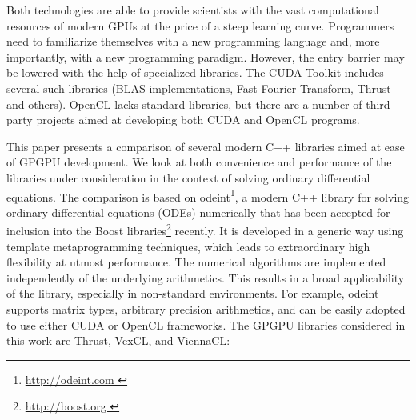 \documentclass[final]{siamltex}
\begin{document}
Both technologies are able to provide scientists with the vast computational
resources of modern GPUs at the price of a steep learning curve.  Programmers
need to familiarize themselves with a new programming language and, more
importantly, with a new programming paradigm. However, the entry barrier may be
lowered with the help of specialized libraries. The CUDA Toolkit includes
several such libraries (BLAS implementations, Fast Fourier Transform, Thrust
and others). OpenCL lacks standard libraries, but there are a number of
third-party projects aimed at developing both CUDA and OpenCL programs.

This paper presents a comparison of several modern C++ libraries aimed at ease
of GPGPU development. We look at both convenience and performance of the
libraries under consideration in the context of solving ordinary differential
equations.  The comparison is based on odeint\footnote{ \href{
http://odeint.com }{ http://odeint.com } }, a modern C++ library for solving
ordinary differential equations (ODEs) numerically  \cite{OdeintRef1,
OdeintRef2} that has been accepted for inclusion into the Boost
libraries\footnote{ \href{ http://boost.org } { http://boost.org } } recently.
It is developed in a generic way using template metaprogramming techniques,
which leads to extraordinary high flexibility at utmost performance. The
numerical algorithms are implemented independently of the underlying
arithmetics. This results in a broad applicability of the library, especially
in non-standard environments.  For example, odeint supports matrix types,
arbitrary precision arithmetics, and can be easily adopted to use either CUDA
or OpenCL frameworks.  The GPGPU libraries considered in this work are Thrust,
VexCL, and ViennaCL:

\end{document}
